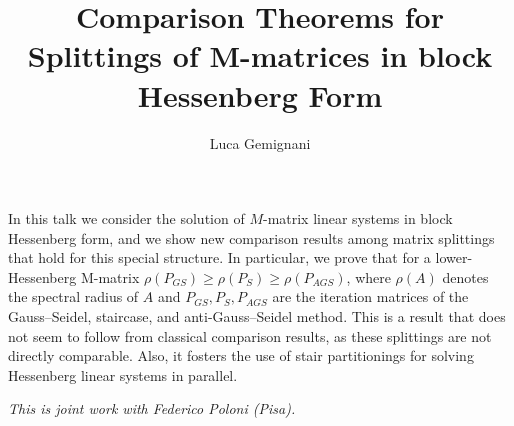 \documentclass[a4paper]{amsart}
\date{}
\begin{document}
\title{Comparison Theorems for Splittings of M-matrices in block Hessenberg Form}
\author{Luca Gemignani} %
\address{University of Pisa} %

\maketitle


In this  talk  we consider the solution of $M$-matrix linear systems  
 in block Hessenberg form, and we show new comparison results among 
 matrix splittings that hold for this special structure.
In particular, we prove that for
a lower-Hessenberg M-matrix $\rho(P_{GS})\geq \rho(P_S)\geq \rho(P_{AGS})$,
 where $\rho(A)$ denotes the spectral radius of $A$ and 
$P_{GS}, P_S, P_{AGS}$ are the iteration matrices of the Gauss--Seidel,
staircase, and anti-Gauss--Seidel method.
This is a result that does not seem to follow from classical
comparison results, as these splittings are not directly comparable.
Also,  it  fosters the  use  of stair partitionings  for solving  Hessenberg  linear systems in parallel.  


\emph{This is joint work with Federico Poloni (Pisa).}
 
\end{document}
